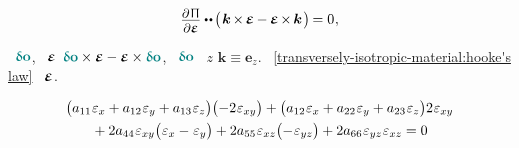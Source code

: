 \nopagebreak\vspace{-0.1em}
\begin{equation}
\label{transversely-isotropic-material:hooke's law}
\scalebox{.9}{$
   \displaystyle\frac{%
      \raisemath{-0.2em}{ \partial \hspace{.2ex} \potentialenergydensity }}%
      { \partial \infinitesimaldeformation }
$} %
\dotdotp \hspace{-.2ex}
\bigl( \hspace{.2ex}
   \bm{k}
   \hspace{-.2ex} \times \hspace{-.2ex}
   \infinitesimaldeformation
   \hspace{-.1ex} - \hspace{-.1ex}
   \infinitesimaldeformation
   \hspace{-.2ex} \times \hspace{-.2ex}
   \bm{k}
\hspace{.2ex} \bigr) \hspace{-.2ex}
= 0
\hspace{.1ex}
,
\end{equation}

\noindent
{}
~${ \varvector{\bm{o}} }$,
~$\infinitesimaldeformation$
${
   \varvector{\bm{o}} \times \infinitesimaldeformation
   - \infinitesimaldeformation \times \varvector{\bm{o}}
}$,
~$\varvector{\bm{o}}$
~$z$
${\bm{k} \equiv \bm{e}_z}$.
~\eqref{transversely-isotropic-material:hooke's law}
~$\infinitesimaldeformation$.

\noindent
\begin{multline*}\label{equationforelasticmoduliforatransverselyisotropicmaterial}
\bigl(
    a_{11} \infinitesimaldeformationcomponents{x}
  + a_{12} \infinitesimaldeformationcomponents{y}
  + a_{13} \infinitesimaldeformationcomponents{z}
\bigr)
\bigl(
  - 2 \infinitesimaldeformationcomponents{xy}
\bigr)
+
\bigl(
    a_{12} \infinitesimaldeformationcomponents{x}
  + a_{22} \infinitesimaldeformationcomponents{y}
  + a_{23} \infinitesimaldeformationcomponents{z}
\bigr) 2 \infinitesimaldeformationcomponents{xy}
\\
%
{}+ 2 a_{44} \infinitesimaldeformationcomponents{xy}
  \bigl( \infinitesimaldeformationcomponents{x} - \infinitesimaldeformationcomponents{y} \bigr)
+ 2 a_{55} \infinitesimaldeformationcomponents{xz}
  \bigl( -\infinitesimaldeformationcomponents{yz} \bigr)
+ 2 a_{66} \infinitesimaldeformationcomponents{yz} \infinitesimaldeformationcomponents{xz}
= 0
\end{multline*}

